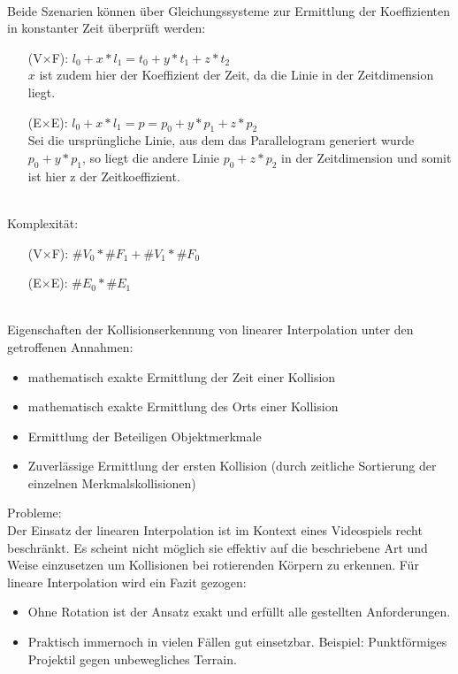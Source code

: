 \ \\
		Beide Szenarien können über Gleichungssysteme zur Ermittlung der Koeffizienten in konstanter Zeit überprüft werden:
		\begin{itemize}
			\item [(V$\times$F):] $l_0 + x * l_1 = t_0 + y*t_1 + z*t_2$\\
				$x$ ist zudem hier der Koeffizient der Zeit, da die Linie in der Zeitdimension liegt.
			\item [(E$\times$E):] $l_0 + x * l_1 = p = p_0 + y*p_1 + z*p_2$\\
				Sei die ursprüngliche Linie, aus dem das Parallelogram generiert wurde $p_0+y*p_1$, so liegt die andere Linie $p_0 + z*p_2$ in der Zeitdimension und somit ist hier z der Zeitkoeffizient.
		\end{itemize}
\ \\
		Komplexität:
\begin{itemize}
			\item [(V$\times$F):] $\#V_0*\#F_1 + \#V_1*\#F_0$
			\item [(E$\times$E):] $\#E_0*\#E_1$
		\end{itemize}
\ \\
		Eigenschaften der Kollisionserkennung von linearer Interpolation unter den getroffenen Annahmen:
		\begin{itemize}
			\item mathematisch exakte Ermittlung der Zeit einer Kollision
			\item mathematisch exakte Ermittlung des Orts einer Kollision
			\item Ermittlung der Beteiligen Objektmerkmale
			\item Zuverlässige Ermittlung der ersten Kollision (durch zeitliche Sortierung der einzelnen Merkmalskollisionen)
		\end{itemize}
Probleme:\\
Der Einsatz der linearen Interpolation ist im Kontext eines Videospiels recht beschränkt.
Es scheint nicht möglich sie effektiv auf die beschriebene Art und Weise einzusetzen um Kollisionen bei rotierenden Körpern zu erkennen.
Für lineare Interpolation wird ein Fazit gezogen:
\begin{itemize}
	\item Ohne Rotation ist der Ansatz exakt und erfüllt alle gestellten Anforderungen.
	\item Praktisch immernoch in vielen Fällen gut einsetzbar. Beispiel: Punktförmiges Projektil gegen unbewegliches Terrain.
\end{itemize}

